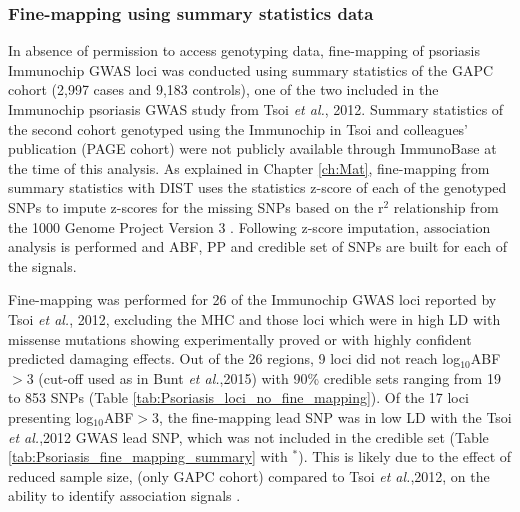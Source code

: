 \subsubsection{Fine-mapping using summary statistics data}
In absence of permission to access genotyping data, fine-mapping of psoriasis Immunochip GWAS loci was conducted using summary statistics of the GAPC cohort (2,997 cases and 9,183 controls), one of the two included in the Immunochip psoriasis GWAS study from Tsoi \textit{et al.}, 2012. Summary statistics of the second cohort genotyped using the Immunochip in Tsoi and colleagues' publication (PAGE cohort) were not publicly available through ImmunoBase at the time of this analysis. As explained in Chapter \ref{ch:Mat}, fine-mapping from summary statistics with DIST uses the statistics z-score of each of the genotyped SNPs to impute z-scores for the missing SNPs based on the r$^2$ relationship from the 1000 Genome Project Version 3 \parencite{Lee2013}. Following z-score imputation, association analysis is performed and ABF, PP and credible set of SNPs are built for each of the signals. 

Fine-mapping was performed for 26 of the Immunochip GWAS loci reported by Tsoi \textit{et al.}, 2012, excluding the MHC and those loci which were in high LD with missense mutations showing experimentally proved or with highly confident predicted damaging effects. Out of the 26 regions, 9 loci did not reach log$_{10}$ABF$>$3 (cut-off used as in Bunt \textit{et al.},2015) with 90\% credible sets ranging from 19 to 853 SNPs (Table \ref{tab:Psoriasis_loci_no_fine_mapping}). Of the 17 loci presenting log$_{10}$ABF$>$3, the fine-mapping lead SNP was in low LD with the Tsoi \textit{et al.},2012 GWAS lead SNP, which was not included in the credible set (Table \ref{tab:Psoriasis_fine_mapping_summary} with $^\ast$). This is likely due to the effect of reduced sample size, (only GAPC cohort) compared to Tsoi \textit{et al.},2012, on the ability to identify association signals \parencite{Bunt2015}. 




